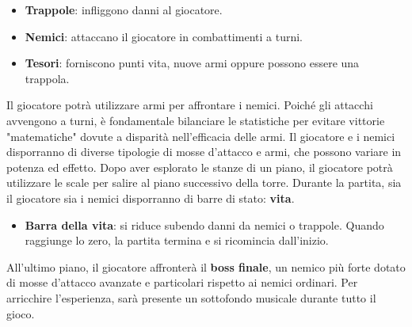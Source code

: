 \documentclass[a4paper,12pt]{report}
\begin{document}
\begin{itemize}
    \item \textbf{Trappole}: infliggono danni al giocatore.
    \item \textbf{Nemici}: attaccano il giocatore in combattimenti a turni.
    \item \textbf{Tesori}: forniscono punti vita, nuove armi oppure possono essere una trappola.
\end{itemize}
%
Il giocatore potrà utilizzare armi per affrontare i nemici. Poiché gli attacchi avvengono a turni, 
%
è fondamentale bilanciare le statistiche per evitare vittorie "matematiche" dovute a disparità nell'efficacia delle armi. 
%
Il giocatore e i nemici disporranno di diverse tipologie di mosse d'attacco e armi, che possono variare in potenza ed effetto.
%
Dopo aver esplorato le stanze di un piano, il giocatore potrà utilizzare le scale per salire al piano successivo della torre. 
%
Durante la partita, sia il giocatore sia i nemici disporranno di barre di stato: \textbf{vita}.
%
\begin{itemize}
    \item \textbf{Barra della vita}: si riduce subendo danni da nemici o trappole. Quando raggiunge lo zero, la partita termina e si ricomincia dall'inizio.
\end{itemize}
%
All’ultimo piano, il giocatore affronterà il \textbf{boss finale}, un nemico più forte dotato di mosse d'attacco avanzate e particolari rispetto ai nemici ordinari.
%
Per arricchire l’esperienza, sarà presente un sottofondo musicale durante tutto il gioco.
%
\end{document}
